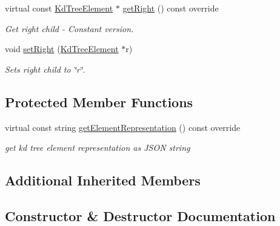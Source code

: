 \begin{DoxyCompactItemize}
virtual const \hyperlink{classbridges_1_1datastructure_1_1_kd_tree_element}{Kd\+Tree\+Element} $\ast$ \hyperlink{classbridges_1_1datastructure_1_1_kd_tree_element_ae8d6007d3848b72cbfc11d2e29120781}{get\+Right} () const override
\begin{DoxyCompactList}\small\item\em Get right child -\/ Constant version. \end{DoxyCompactList}\item 
void \hyperlink{classbridges_1_1datastructure_1_1_kd_tree_element_aee269fced2901e0cb580f998457176ca}{set\+Right} (\hyperlink{classbridges_1_1datastructure_1_1_kd_tree_element}{Kd\+Tree\+Element} $\ast$r)
\begin{DoxyCompactList}\small\item\em Sets right child to \char`\"{}r\char`\"{}. \end{DoxyCompactList}\end{DoxyCompactItemize}
\subsection*{Protected Member Functions}
\begin{DoxyCompactItemize}
\item 
virtual const string \hyperlink{classbridges_1_1datastructure_1_1_kd_tree_element_a5413ecaf152e3df5fb45dd85da812888}{get\+Element\+Representation} () const override
\begin{DoxyCompactList}\small\item\em get kd tree element representation as J\+S\+ON string \end{DoxyCompactList}\end{DoxyCompactItemize}
\subsection*{Additional Inherited Members}


\subsection{Constructor \& Destructor Documentation}
\mbox{\label{classbridges_1_1datastructure_1_1_kd_tree_element_a5dd9f121e73a5c0643dfb52401472297}} 
